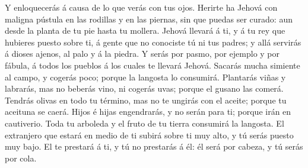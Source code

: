  Y enloquecerás á causa de lo que verás con tus ojos.
 Herirte ha Jehová con maligna pústula en las rodillas y en
las piernas, sin que puedas ser curado: aun desde la planta de tu pie
hasta tu mollera.  Jehová llevará á ti, y á tu rey que
hubieres puesto sobre ti, á gente que no conociste tú ni tus padres; y
allá servirás á dioses ajenos, al palo y á la piedra.  Y
serás por pasmo, por ejemplo y por fábula, á todos los pueblos á los
cuales te llevará Jehová.  Sacarás mucha simiente al campo,
y cogerás poco; porque la langosta lo consumirá.  Plantarás
viñas y labrarás, mas no beberás vino, ni cogerás uvas; porque el gusano
las comerá.  Tendrás olivas en todo tu término, mas no te
ungirás con el aceite; porque tu aceituna se caerá.  Hijos
é hijas engendrarás, y no serán para ti; porque irán en cautiverio.
 Toda tu arboleda y el fruto de tu tierra consumirá la
langosta.  El extranjero que estará en medio de ti subirá
sobre ti muy alto, y tú serás puesto muy bajo.  El te
prestará á ti, y tú no prestarás á él: él será por cabeza, y tú serás
por cola.

